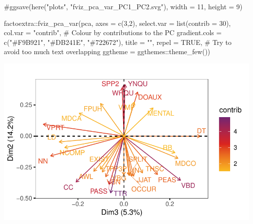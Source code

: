 \documentclass[
  letterpaper,
  DIV=11,
  numbers=noendperiod]{scrreprt}
\newenvironment{Shaded}{\begin{snugshade}}{\end{snugshade}}
\newcommand{\AttributeTok}[1]{\textcolor[rgb]{0.40,0.45,0.13}{#1}}
\newcommand{\CommentTok}[1]{\textcolor[rgb]{0.37,0.37,0.37}{#1}}
\newcommand{\ConstantTok}[1]{\textcolor[rgb]{0.56,0.35,0.01}{#1}}
\newcommand{\DecValTok}[1]{\textcolor[rgb]{0.68,0.00,0.00}{#1}}
\newcommand{\FunctionTok}[1]{\textcolor[rgb]{0.28,0.35,0.67}{#1}}
\newcommand{\NormalTok}[1]{\textcolor[rgb]{0.00,0.23,0.31}{#1}}
\newcommand{\SpecialCharTok}[1]{\textcolor[rgb]{0.37,0.37,0.37}{#1}}
\newcommand{\StringTok}[1]{\textcolor[rgb]{0.13,0.47,0.30}{#1}}
\begin{document}
\begin{Shaded}
\begin{Highlighting}[]
\CommentTok{\#ggsave(here("plots", "fviz\_pca\_var\_PC1\_PC2.svg"), width = 11, height = 9)}

\NormalTok{factoextra}\SpecialCharTok{::}\FunctionTok{fviz\_pca\_var}\NormalTok{(pca,}
             \AttributeTok{axes =} \FunctionTok{c}\NormalTok{(}\DecValTok{3}\NormalTok{,}\DecValTok{2}\NormalTok{),}
             \AttributeTok{select.var =} \FunctionTok{list}\NormalTok{(}\AttributeTok{contrib =} \DecValTok{30}\NormalTok{),}
             \AttributeTok{col.var =} \StringTok{"contrib"}\NormalTok{, }\CommentTok{\# Colour by contributions to the PC}
             \AttributeTok{gradient.cols =} \FunctionTok{c}\NormalTok{(}\StringTok{"\#F9B921"}\NormalTok{, }\StringTok{"\#DB241E"}\NormalTok{, }\StringTok{"\#722672"}\NormalTok{),}
             \AttributeTok{title =} \StringTok{""}\NormalTok{,}
             \AttributeTok{repel =} \ConstantTok{TRUE}\NormalTok{, }\CommentTok{\# Try to avoid too much text overlapping}
             \AttributeTok{ggtheme =}\NormalTok{ ggthemes}\SpecialCharTok{::}\FunctionTok{theme\_few}\NormalTok{())}
\end{Highlighting}
\end{Shaded}

\includegraphics{AppendixF_files/figure-pdf/graphs-of-variables-2.pdf}
\end{document}
